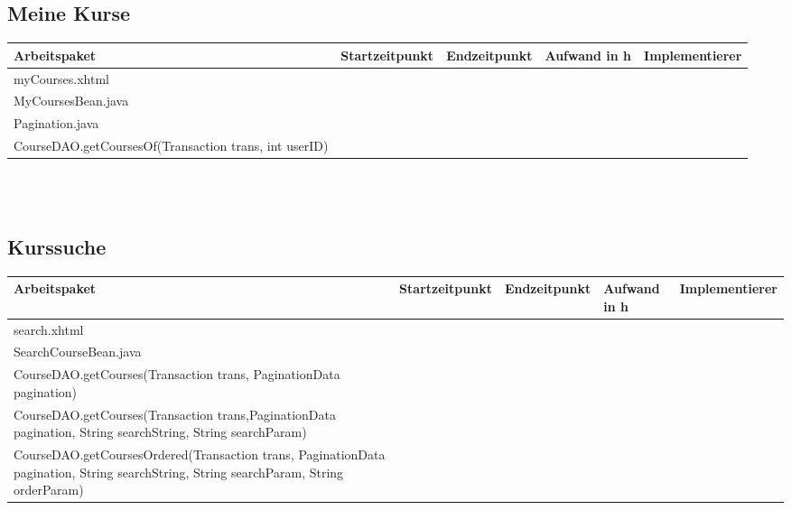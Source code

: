 \begin{landscape}
\subsection{Meine Kurse}
\begin{tabular}{|p{10cm}|p{4cm}|p{3cm}|p{3cm}|p{3cm}|}
	\hline  \textbf{Arbeitspaket} & \textbf{Startzeitpunkt} & \textbf{Endzeitpunkt} & \textbf{Aufwand in h} & \textbf{Implementierer} \\ 
	\hline   myCourses.xhtml                                      &                            &                             &                     &\\
	\hline   MyCoursesBean.java                                   &                            &                             &                     &\\ 
	\hline   Pagination.java                                      &                            &                             &                     &\\ 
	\hline   CourseDAO.getCoursesOf(Transaction trans, int userID)&                            &                             &                     &\\ 
	\hline 
\end{tabular} \ \\
\ \\

\subsection{Kurssuche}
\begin{tabular}{|p{10cm}|p{4cm}|p{3cm}|p{3cm}|p{3cm}|}
	\hline  \textbf{Arbeitspaket} & \textbf{Startzeitpunkt} & \textbf{Endzeitpunkt} & \textbf{Aufwand in h} & \textbf{Implementierer} \\ 
	\hline   search.xhtml                                         &                            &                             &                     &\\
	\hline   SearchCourseBean.java                                &                            &                             &                     &\\ 
	\hline   CourseDAO.getCourses(Transaction trans, PaginationData pagination)                                      &                            &                             &                     &\\ 
	\hline  CourseDAO.getCourses(Transaction trans,PaginationData pagination, String searchString, String searchParam)&                            &                             &                     &\\
	\hline  CourseDAO.getCoursesOrdered(Transaction trans, PaginationData pagination, String searchString, String searchParam, String orderParam)&                            &                             &                     &\\ 
	\hline 
\end{tabular} \ \\
\ \\

\end{landscape}




